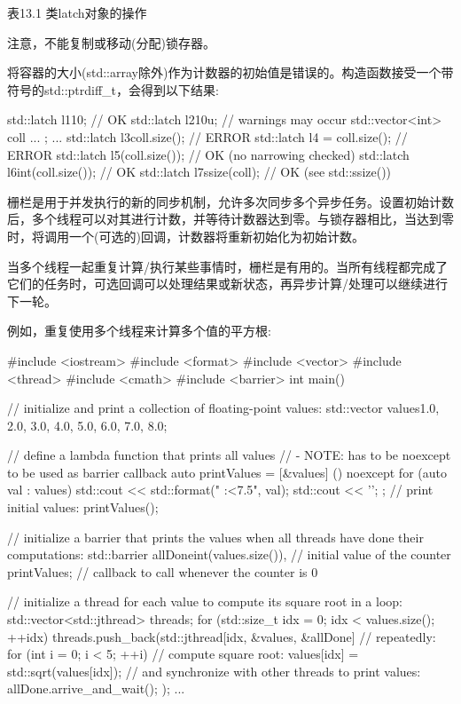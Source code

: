 \begin{center}
表13.1 类latch对象的操作
\end{center}

注意，不能复制或移动(分配)锁存器。

将容器的大小(std::array除外)作为计数器的初始值是错误的。构造函数接受一个带符号的std::ptrdiff\_t，会得到以下结果:

\begin{cpp}
std::latch l1{10}; // OK
std::latch l2{10u}; // warnings may occur
std::vector<int> coll{ ... };
...
std::latch l3{coll.size()}; // ERROR
std::latch l4 = coll.size(); // ERROR
std::latch l5(coll.size()); // OK (no narrowing checked)
std::latch l6{int(coll.size())}; // OK
std::latch l7{ssize(coll)}; // OK (see std::ssize())
\end{cpp}


栅栏是用于并发执行的新的同步机制，允许多次同步多个异步任务。设置初始计数后，多个线程可以对其进行计数，并等待计数器达到零。与锁存器相比，当达到零时，将调用一个(可选的)回调，计数器将重新初始化为初始计数。

当多个线程一起重复计算/执行某些事情时，栅栏是有用的。当所有线程都完成了它们的任务时，可选回调可以处理结果或新状态，再异步计算/处理可以继续进行下一轮。

例如，重复使用多个线程来计算多个值的平方根:


\begin{cpp}
#include <iostream>
#include <format>
#include <vector>
#include <thread>
#include <cmath>
#include <barrier>
int main()
{
	// initialize and print a collection of floating-point values:
	std::vector values{1.0, 2.0, 3.0, 4.0, 5.0, 6.0, 7.0, 8.0};

	// define a lambda function that prints all values
	// - NOTE: has to be noexcept to be used as barrier callback
	auto printValues = [&values] () noexcept{
						for (auto val : values) {
							std::cout << std::format(" {:<7.5}", val);
						}
						std::cout << '\n';
					};
	// print initial values:
	printValues();

	// initialize a barrier that prints the values when all threads have done their computations:
	std::barrier allDone{int(values.size()), // initial value of the counter
						 printValues}; // callback to call whenever the counter is 0

	// initialize a thread for each value to compute its square root in a loop:
	std::vector<std::jthread> threads;
	for (std::size_t idx = 0; idx < values.size(); ++idx) {
		threads.push_back(std::jthread{[idx, &values, &allDone] {
				// repeatedly:
				for (int i = 0; i < 5; ++i) {
					// compute square root:
					values[idx] = std::sqrt(values[idx]);
					// and synchronize with other threads to print values:
					allDone.arrive_and_wait();
				}
		}});
	}
	...
}
\end{cpp}

